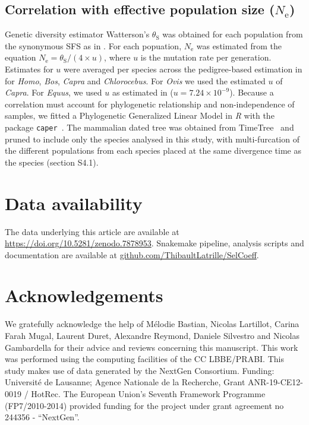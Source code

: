 \documentclass{article}
\newcommand{\Ne}{N_{\text{e}}}
\newcommand{\thetaSyn}{\theta_{\text{S}}}
\begin{document}
    \subsection{Correlation with effective population size ($\Ne$)}
    \label{subsec:correlation-diversity}
    Genetic diversity estimator Watterson's $\thetaSyn$ was obtained for each population from the synonymous SFS as in \textcite{achaz_frequency_2009}.
    For each popuation, $\Ne$ was estimated from the equation $\Ne=\thetaSyn / (4 \times u)$, where $u$ is the mutation rate per generation.
    Estimates for $u$ were averaged per species across the pedigree-based estimation in \textcite{bergeron_evolution_2023} for \textit{Homo}, \textit{Bos}, \textit{Capra} and \textit{Chlorocebus}.
    For \textit{Ovis} we used the estimated $u$ of \textit{Capra}.
    For \textit{Equus}, we used $u$ as estimated in \textcite{orlando_recalibrating_2013} ($u=7.24\times10^{-9}$).
    Because a correlation must account for phylogenetic relationship and non-independence of samples, we fitted a Phylogenetic Generalized Linear Model in \textit{R} with the package \texttt{caper}~\cite{orme_caper_2013}.
    The mammalian dated tree was obtained from TimeTree~\cite{kumar_timetree_2017} and pruned to include only the species analysed in this study, with multi-furcation of the different populations from each species placed at the same divergence time as the species (section S4.1).

    \section*{Data availability}
    The data underlying this article are available at \url{https://doi.org/10.5281/zenodo.7878953}.
    Snakemake pipeline, analysis scripts and documentation are available at \href{https://github.com/ThibaultLatrille/SelCoeff}{github.com/ThibaultLatrille/SelCoeff}.

    \section*{Acknowledgements}
    \label{sec:acknowledgment}
    We gratefully acknowledge the help of Mélodie Bastian, Nicolas Lartillot, Carina Farah Mugal, Laurent Duret, Alexandre Reymond, Daniele Silvestro and Nicolas Gambardella for their advice and reviews concerning this manuscript.
    This work was performed using the computing facilities of the CC LBBE/PRABI\@.
    This study makes use of data generated by the NextGen Consortium.
    Funding:
    Université de Lausanne; Agence Nationale de la Recherche, Grant ANR-19-CE12-0019 / HotRec.
    The European Union’s Seventh Framework Programme (FP7/2010-2014) provided funding for the project under grant agreement no 244356 - “NextGen”.
\end{document}
